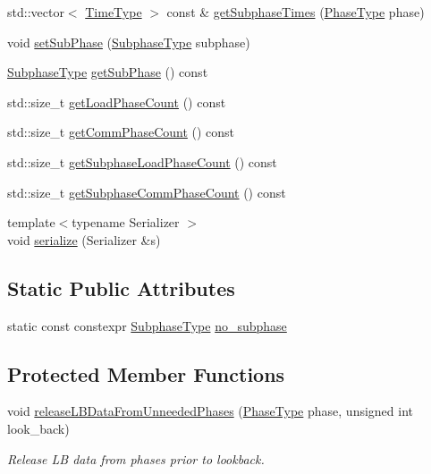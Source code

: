 \begin{DoxyCompactItemize}
\item 
std\+::vector$<$ \hyperlink{namespacevt_a876a9d0cd5a952859c72de8a46881442}{Time\+Type} $>$ const  \& \hyperlink{structvt_1_1elm_1_1_element_l_b_data_a9d1dd5210bfe33d555d729b9c3486d46}{get\+Subphase\+Times} (\hyperlink{namespacevt_a46ce6733d5cdbd735d561b7b4029f6d7}{Phase\+Type} phase)
\item 
void \hyperlink{structvt_1_1elm_1_1_element_l_b_data_a93c02f4370d1622fefe6a63f0f360d96}{set\+Sub\+Phase} (\hyperlink{namespacevt_ae78cbfdf1e57470e33eedb074f2beeba}{Subphase\+Type} subphase)
\item 
\hyperlink{namespacevt_ae78cbfdf1e57470e33eedb074f2beeba}{Subphase\+Type} \hyperlink{structvt_1_1elm_1_1_element_l_b_data_a00c4afedbaa4b2cbebf877ea194297c3}{get\+Sub\+Phase} () const
\item 
std\+::size\+\_\+t \hyperlink{structvt_1_1elm_1_1_element_l_b_data_a2caf9adf8c33a1d2dda021388b84bb00}{get\+Load\+Phase\+Count} () const
\item 
std\+::size\+\_\+t \hyperlink{structvt_1_1elm_1_1_element_l_b_data_a5164aaf6b9aa619465454b7d24273f10}{get\+Comm\+Phase\+Count} () const
\item 
std\+::size\+\_\+t \hyperlink{structvt_1_1elm_1_1_element_l_b_data_ab8778cab537f8428281088d47c18eebc}{get\+Subphase\+Load\+Phase\+Count} () const
\item 
std\+::size\+\_\+t \hyperlink{structvt_1_1elm_1_1_element_l_b_data_ae042437f8dcaff5822b670b73b4e724b}{get\+Subphase\+Comm\+Phase\+Count} () const
\item 
{\footnotesize template$<$typename Serializer $>$ }\\void \hyperlink{structvt_1_1elm_1_1_element_l_b_data_a621cfc47dbcd0505e25d9060a78f080f}{serialize} (Serializer \&s)
\end{DoxyCompactItemize}
\subsection*{Static Public Attributes}
\begin{DoxyCompactItemize}
\item 
static const constexpr \hyperlink{namespacevt_ae78cbfdf1e57470e33eedb074f2beeba}{Subphase\+Type} \hyperlink{structvt_1_1elm_1_1_element_l_b_data_af93ba399701c539f3acbe75095e0d080}{no\+\_\+subphase}
\end{DoxyCompactItemize}
\subsection*{Protected Member Functions}
\begin{DoxyCompactItemize}
\item 
void \hyperlink{structvt_1_1elm_1_1_element_l_b_data_ad74e3a2d52dc65533df25846211c9aa4}{release\+L\+B\+Data\+From\+Unneeded\+Phases} (\hyperlink{namespacevt_a46ce6733d5cdbd735d561b7b4029f6d7}{Phase\+Type} phase, unsigned int look\+\_\+back)
\begin{DoxyCompactList}\small\item\em Release LB data from phases prior to lookback. \end{DoxyCompactList}\end{DoxyCompactItemize}

